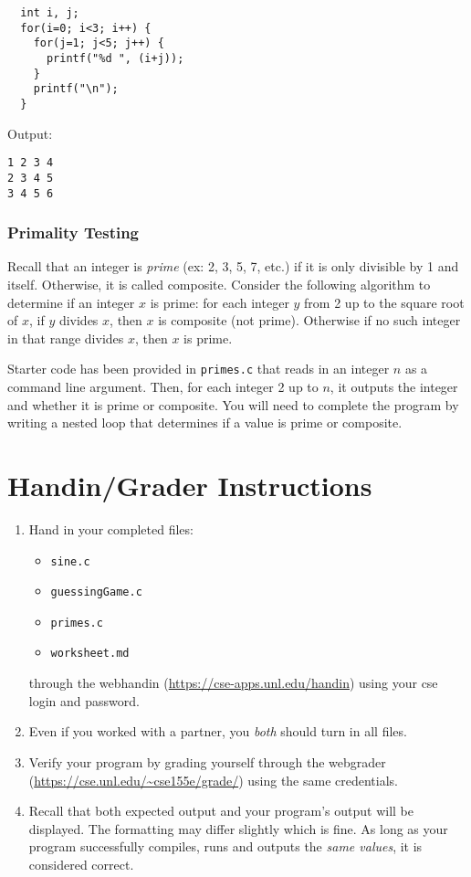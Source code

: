 \documentclass[12pt]{scrartcl}
\begin{document}
\begin{verbatim}
  int i, j;
  for(i=0; i<3; i++) {
    for(j=1; j<5; j++) {
      printf("%d ", (i+j));
    }
    printf("\n");
  }
\end{verbatim}

Output:

\begin{verbatim}
1 2 3 4
2 3 4 5
3 4 5 6
\end{verbatim}

\subsubsection*{Primality Testing}

Recall that an integer is \emph{prime} (ex: 2, 3, 5, 7, etc.) if it 
is only divisible by 1 and itself.  Otherwise, it is called composite.  
Consider the following algorithm to determine if an integer $x$ is 
prime: for each integer $y$ from 2 up to the square root of $x$, if $y$ 
divides $x$, then $x$ is composite (not prime).  Otherwise if no such 
integer in that range divides $x$, then $x$ is prime.  

Starter code has been provided in \texttt{primes.c}
that reads in an integer $n$ as a command line argument.  Then, for 
each integer 2 up to $n$, it outputs the integer 
and whether it is prime or composite.  You will need to complete
the program by writing a nested loop that determines if a value
is prime or composite.  

\section{Handin/Grader Instructions}

\begin{enumerate}
  \item Hand in your completed files:
  \begin{itemize}
    \item \texttt{sine.c}
    \item \texttt{guessingGame.c}
    \item \texttt{primes.c}
    \item \texttt{worksheet.md}
  \end{itemize}
  through the webhandin (\url{https://cse-apps.unl.edu/handin}) 
  using your cse login and password.  
  \item Even if you worked with a partner, you \emph{both} should
  turn in all files.
  \item Verify your program by grading yourself through the
  webgrader (\url{https://cse.unl.edu/~cse155e/grade/}) using the
  same credentials.
  \item Recall that both expected output and your program's output
  will be displayed.  The formatting may differ slightly which is fine.
  As long as your program successfully compiles, runs and outputs 
  the \emph{same values}, it is considered correct.
\end{enumerate}
\end{document}
